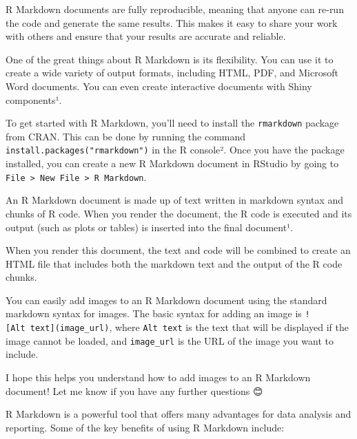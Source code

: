 \documentclass[
]{book}
\begin{document}
R Markdown documents are fully reproducible, meaning that anyone can re-run the code and generate the same results. This makes it easy to share your work with others and ensure that your results are accurate and reliable.

One of the great things about R Markdown is its flexibility. You can use it to create a wide variety of output formats, including HTML, PDF, and Microsoft Word documents. You can even create interactive documents with Shiny components¹.

To get started with R Markdown, you'll need to install the \texttt{rmarkdown} package from CRAN. This can be done by running the command \texttt{install.packages("rmarkdown")} in the R console². Once you have the package installed, you can create a new R Markdown document in RStudio by going to \texttt{File\ \textgreater{}\ New\ File\ \textgreater{}\ R\ Markdown}.

An R Markdown document is made up of text written in markdown syntax and chunks of R code. When you render the document, the R code is executed and its output (such as plots or tables) is inserted into the final document¹.

When you render this document, the text and code will be combined to create an HTML file that includes both the markdown text and the output of the R code chunks.

You can easily add images to an R Markdown document using the standard markdown syntax for images. The basic syntax for adding an image is \texttt{!{[}Alt\ text{]}(image\_url)}, where \texttt{Alt\ text} is the text that will be displayed if the image cannot be loaded, and \texttt{image\_url} is the URL of the image you want to include.

I hope this helps you understand how to add images to an R Markdown document! Let me know if you have any further questions 😊

R Markdown is a powerful tool that offers many advantages for data analysis and reporting. Some of the key benefits of using R Markdown include:
\end{document}
